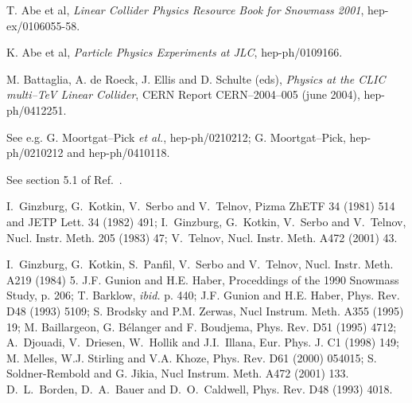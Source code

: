 \begin{thebibliography}{999}
 T. Abe et al, {\it Linear Collider Physics Resource Book for 
Snowmass 2001}, hep-ex/0106055-58.

 K. Abe et al, {\it Particle Physics Experiments at JLC},
hep-ph/0109166.

 M. Battaglia, A. de Roeck, J. Ellis and D. Schulte (eds), 
{\it Physics at the CLIC multi--TeV Linear Collider}, CERN Report 
CERN--2004--005 (june 2004), hep-ph/0412251.  

 See e.g. G. Moortgat--Pick {\it et al.}, 
hep-ph/0210212; G. Moortgat--Pick, hep-ph/0210212 and hep-ph/0410118.

 See section 5.1 of Ref.~\cite{TESLA}. 

 I.~Ginzburg, G.~Kotkin, V.~Serbo and V.~Telnov, 
Pizma ZhETF 34 (1981) 514 and JETP Lett. 34 (1982) 491;
I.~Ginzburg, G.~Kotkin, V.~Serbo and V.~Telnov, Nucl.  Instr.  Meth. 
205 (1983) 47; V.~Telnov, Nucl. Instr. Meth. A472 (2001) 43. 

 I.~Ginzburg, G.~Kotkin, S.~Panfil, V.~Serbo and 
V.~Telnov, Nucl. Instr. Meth. A219 (1984) 5. 
%
J.F. Gunion and H.E. Haber, Proceddings of the 1990 Snowmass Study, p. 206;  
T. Barklow, {\it ibid.} p. 440;  
J.F. Gunion and H.E. Haber, Phys. Rev. D48 (1993) 5109; 
S. Brodsky and P.M. Zerwas, Nucl Instrum. Meth. A355 (1995) 19; 
M. Baillargeon, G. B\'elanger and F. Boudjema,  Phys. Rev. D51 (1995) 4712;  
A.~Djouadi, V.~Driesen, W.~Hollik and J.I.~Illana, Eur. Phys. J. C1 (1998) 149;
M. Melles, W.J. Stirling and V.A. Khoze, Phys. Rev. D61 (2000) 054015; 
S. Soldner-Rembold and G. Jikia, Nucl Instrum. Meth. A472 (2001) 133.  
%
 D.~L.~Borden, D.~A.~Bauer and D.~O.~Caldwell, Phys. Rev. D48 
(1993) 4018.  


\end{thebibliography}
